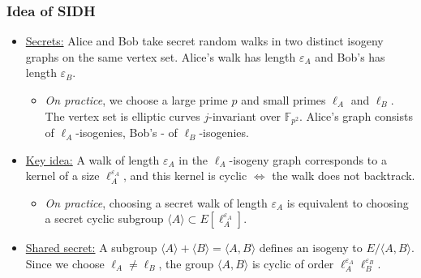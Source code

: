 \documentclass{beamer}
\begin{document}
\begin{frame}
\frametitle{Idea of SIDH}

	\begin{itemize}
		\item \underline{Secrets:} Alice and Bob take secret random walks in two \alert{distinct} isogeny graphs on \alert{the same vertex set}. Alice's walk has length $\varepsilon_A$ and Bob's has length $\varepsilon_B$.
		
			\begin{itemize}
				\item \emph{On practice}, we choose a large prime $p$ and small primes $\ell_A$ and $\ell_B$. The vertex set is elliptic curves $j$-invariant over $\mathbb{F}_{p^2}$. Alice's graph consists of $\ell_A$-isogenies, Bob's - of $\ell_B$-isogenies.
			\end{itemize}
	
		\item \underline{Key idea:} A walk of length $\varepsilon_A$ in the $\ell_A$-isogeny graph corresponds to a kernel of a size $\ell_A^{\varepsilon_A}$, and this kernel is cyclic $\iff$ the walk does not backtrack.
			\begin{itemize}
				\item \emph{On practice}, choosing a secret walk of length $\varepsilon_A$ is equivalent to choosing a secret cyclic subgroup $\langle A \rangle \subset E[\ell_A^{\varepsilon_A}]$.
			\end{itemize}
		\item \underline{Shared secret:} A subgroup $\langle A \rangle + \langle B \rangle = \langle A, B \rangle$  defines an isogeny to $E/\langle A, B \rangle$. Since we choose $\ell_A \neq \ell_B$, the group $\langle A, B \rangle$ is cyclic of order $\ell_A^{\varepsilon_A} \ell_B^{\varepsilon_B}$.	
	\end{itemize}
\end{frame}
\end{document}
